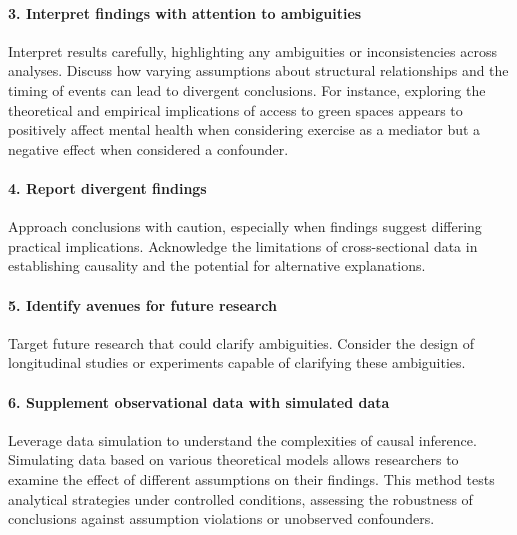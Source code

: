 \documentclass[
  single column]{article}
\let\oldparagraph\paragraph
\renewcommand{\paragraph}[1]{\oldparagraph{#1}\mbox{}}
\begin{document}
\paragraph{\texorpdfstring{3. \textbf{Interpret findings with attention
to
ambiguities}}{3. Interpret findings with attention to ambiguities}}\label{interpret-findings-with-attention-to-ambiguities}

Interpret results carefully, highlighting any ambiguities or
inconsistencies across analyses. Discuss how varying assumptions about
structural relationships and the timing of events can lead to divergent
conclusions. For instance, exploring the theoretical and empirical
implications of access to green spaces appears to positively affect
mental health when considering exercise as a mediator but a negative
effect when considered a confounder.

\paragraph{\texorpdfstring{4. \textbf{Report divergent
findings}}{4. Report divergent findings}}\label{report-divergent-findings}

Approach conclusions with caution, especially when findings suggest
differing practical implications. Acknowledge the limitations of
cross-sectional data in establishing causality and the potential for
alternative explanations.

\paragraph{\texorpdfstring{5. \textbf{Identify avenues for future
research}}{5. Identify avenues for future research}}\label{identify-avenues-for-future-research}

Target future research that could clarify ambiguities. Consider the
design of longitudinal studies or experiments capable of clarifying
these ambiguities.

\paragraph{\texorpdfstring{6. \textbf{Supplement observational data with
simulated
data}}{6. Supplement observational data with simulated data}}\label{supplement-observational-data-with-simulated-data}

Leverage data simulation to understand the complexities of causal
inference. Simulating data based on various theoretical models allows
researchers to examine the effect of different assumptions on their
findings. This method tests analytical strategies under controlled
conditions, assessing the robustness of conclusions against assumption
violations or unobserved confounders.
\end{document}
